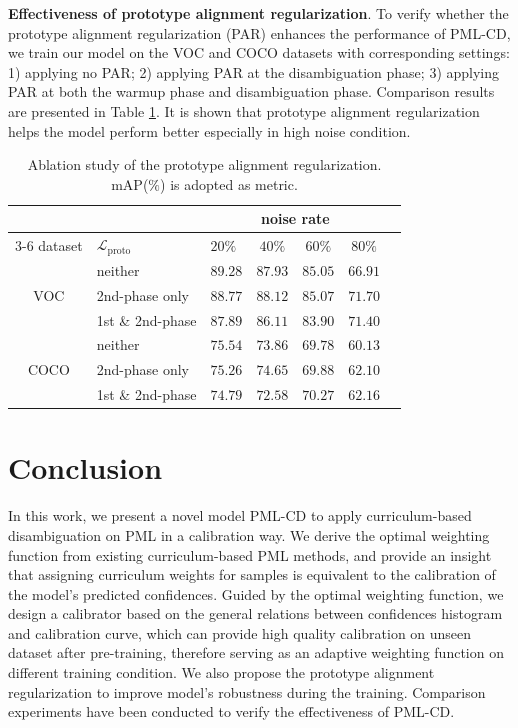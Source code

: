 \documentclass[letterpaper]{article} %
\begin{document}
  \textbf{Effectiveness of prototype alignment regularization}. To verify whether the prototype alignment regularization (PAR) enhances the performance of PML-CD, we train our model on the VOC and COCO datasets with corresponding settings: 1) applying no PAR; 2) applying PAR at the disambiguation phase; 3) applying PAR at both the warmup phase and disambiguation phase. Comparison results are presented in Table \ref{tab:regularization}. It is shown that prototype alignment regularization helps the model perform better especially in high noise condition. 

  \begin{table}[htbp]
    \footnotesize
    \setlength\tabcolsep{5pt}
    \centering
    \begin{tabular}{cllcccc}
    \toprule
      & & \multicolumn{4}{c}{noise rate} \\
      \cmidrule(r){3-6}
      dataset & $\mathcal{L}_\text{proto}$ & $20\%$ & $40\%$ & $60\%$ & $80\%$  \\
    \midrule
      \multirow{3}{*}{VOC}
      & neither           & \cellcolor{gray!30}$89.28$&$87.93$&$85.05$&$66.91$ \\
      & 2nd-phase only    & $88.77$&\cellcolor{gray!30}$88.12$&\cellcolor{gray!30}$85.07$&\cellcolor{gray!30}$71.70$ \\
      & 1st \& 2nd-phase  & $87.89$&$86.11$&$83.90$&$71.40$ \\
    \midrule
      \multirow{3}{*}{COCO}
      & neither           & \cellcolor{gray!30}$75.54$&$73.86$&$69.78$&$60.13$ \\
      & 2nd-phase only    & $75.26$&\cellcolor{gray!30}$74.65$&\cellcolor{gray!30}$69.88$&$62.10$ \\
      & 1st \& 2nd-phase  & $74.79$&$72.58$&$70.27$&\cellcolor{gray!30}$62.16$ \\
    \bottomrule
    \end{tabular}%
    \caption{Ablation study of the prototype alignment regularization. mAP($\%$) is adopted as metric. }
    \label{tab:regularization}%
  \end{table}

\section{Conclusion}

  In this work, we present a novel model PML-CD to apply curriculum-based disambiguation on PML in a calibration way. We derive the optimal weighting function from existing curriculum-based PML methods, and provide an insight that assigning curriculum weights for samples is equivalent to the calibration of the model's predicted confidences. Guided by the optimal weighting function, we design a calibrator based on the general relations between confidences histogram and calibration curve, which can provide high quality calibration on unseen dataset after pre-training, therefore serving as an adaptive weighting function on different training condition. We also propose the prototype alignment regularization to improve model's robustness during the training. Comparison experiments have been conducted to verify the effectiveness of PML-CD. 
\end{document}
